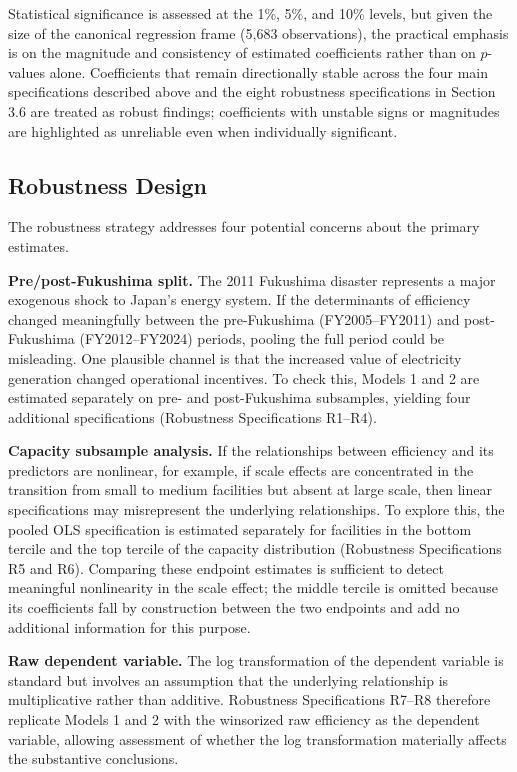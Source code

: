 \documentclass[12pt,a4paper]{article}
\begin{document}
Statistical significance is assessed at the 1\%, 5\%, and 10\% levels, but given the size of the canonical regression frame (5,683 observations), the practical emphasis is on the magnitude and consistency of estimated coefficients rather than on $p$-values alone. Coefficients that remain directionally stable across the four main specifications described above and the eight robustness specifications in Section 3.6 are treated as robust findings; coefficients with unstable signs or magnitudes are highlighted as unreliable even when individually significant.

\subsection{Robustness Design}

The robustness strategy addresses four potential concerns about the primary estimates.

\textbf{Pre/post-Fukushima split.} The 2011 Fukushima disaster represents a major exogenous shock to Japan's energy system. If the determinants of efficiency changed meaningfully between the pre-Fukushima (FY2005--FY2011) and post-Fukushima (FY2012--FY2024) periods, pooling the full period could be misleading. One plausible channel is that the increased value of electricity generation changed operational incentives. To check this, Models 1 and 2 are estimated separately on pre- and post-Fukushima subsamples, yielding four additional specifications (Robustness Specifications R1--R4).

\textbf{Capacity subsample analysis.} If the relationships between efficiency and its predictors are nonlinear, for example, if scale effects are concentrated in the transition from small to medium facilities but absent at large scale, then linear specifications may misrepresent the underlying relationships. To explore this, the pooled OLS specification is estimated separately for facilities in the bottom tercile and the top tercile of the capacity distribution (Robustness Specifications R5 and R6). Comparing these endpoint estimates is sufficient to detect meaningful nonlinearity in the scale effect; the middle tercile is omitted because its coefficients fall by construction between the two endpoints and add no additional information for this purpose.

\textbf{Raw dependent variable.} The log transformation of the dependent variable is standard but involves an assumption that the underlying relationship is multiplicative rather than additive. Robustness Specifications R7--R8 therefore replicate Models 1 and 2 with the winsorized raw efficiency as the dependent variable, allowing assessment of whether the log transformation materially affects the substantive conclusions.
\end{document}
